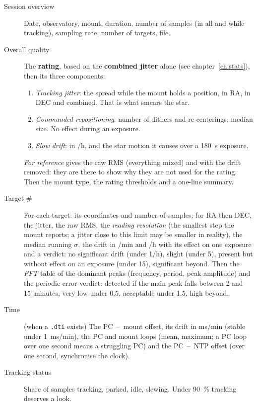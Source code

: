 \begin{description}
  \item[Session overview] Date, observatory, mount, duration, number of samples
  (in all and while tracking), sampling rate, number of targets, file.

  \item[Overall quality] The \textbf{rating}, based on the \textbf{combined
  jitter} alone (see chapter~\ref{ch:stats}), then its three components:
  \begin{enumerate}
    \item \emph{Tracking jitter}: the spread while the mount holds a position,
    in RA, in DEC and combined. That is what smears the star.
    \item \emph{Commanded repositioning}: number of dithers and re-centerings,
    median size. No effect during an exposure.
    \item \emph{Slow drift}: in \arcsec/h, and the star motion it causes over a
    180~s exposure.
  \end{enumerate}
  \emph{For reference} gives the raw RMS (everything mixed) and with the drift
  removed: they are there to show why they are not used for the rating. Then
  the mount type, the rating thresholds and a one-line summary.

  \item[Target \#] For each target: its coordinates and number of samples; for
  RA then DEC, the jitter, the raw RMS, the \emph{reading resolution} (the
  smallest step the mount reports; a jitter close to this limit may be smaller in
  reality), the median running $\sigma$, the drift in \arcsec/min and \arcsec/h
  with its effect on one exposure and a verdict: no significant drift (under
  1\arcsec/h), slight (under 5), present but without effect on an exposure
  (under 15), significant beyond. Then the \emph{FFT} table of the dominant peaks
  (frequency, period, peak amplitude) and the periodic error verdict: detected if
  the main peak falls between 2 and 15~minutes, very low under 0.5\arcsec,
  acceptable under 1.5\arcsec, high beyond.

  \item[Time] (when a \texttt{.dti} exists) The PC~--~mount offset, its drift
  in ms/min (stable under 1~ms/min), the PC and mount loops (mean, maximum; a PC
  loop over one second means a struggling PC) and the PC~--~NTP offset (over
  one second, synchronise the clock).

  \item[Tracking status] Share of samples tracking, parked, idle, slewing. Under
  90~\% tracking deserves a look.


\end{description}
